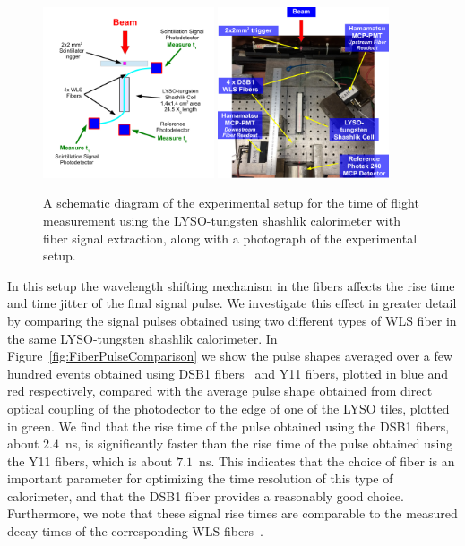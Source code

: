 \documentclass[12pt]{article}
\begin{document}
\begin{figure}[H] \centering
\includegraphics[width=0.45\textwidth]{figs/ShashlikFiberSetupSchematic} 
\includegraphics[width=0.45\textwidth]{figs/ShashlikFiberSetupPhoto} 
\caption{ A schematic diagram of the experimental setup for the
time of flight measurement using the LYSO-tungsten shashlik calorimeter
with fiber signal extraction, along with a photograph of the
experimental setup. } 
\label{fig:ShashlikFiberSetup}
\end{figure}

In this setup the wavelength shifting mechanism in the fibers affects the rise
time and time jitter of the final signal pulse. We investigate this effect in
greater detail by comparing the signal pulses obtained using two different types
of WLS fiber in the same LYSO-tungsten shashlik calorimeter. In
Figure~\ref{fig:FiberPulseComparison} we show the pulse shapes averaged over a
few hundred events obtained using DSB1 fibers~\cite{Albrecht} and Y11 fibers,
plotted in blue and red respectively, compared with the average pulse shape
obtained from direct optical coupling of the photodector to the edge of one of
the LYSO tiles, plotted in green. We find that the rise time of the pulse
obtained using the DSB1 fibers, about $2.4$~ns, is significantly faster than the
rise time of the pulse obtained using the Y11 fibers, which is about $7.1$~ns.
This indicates that the choice of fiber is an important parameter for optimizing
the time resolution of this type of calorimeter, and that the DSB1 fiber
provides a reasonably good choice. Furthermore, we note that these signal rise
times are comparable to the measured decay times of the corresponding WLS
fibers~\cite{Albrecht}.
\end{document}
